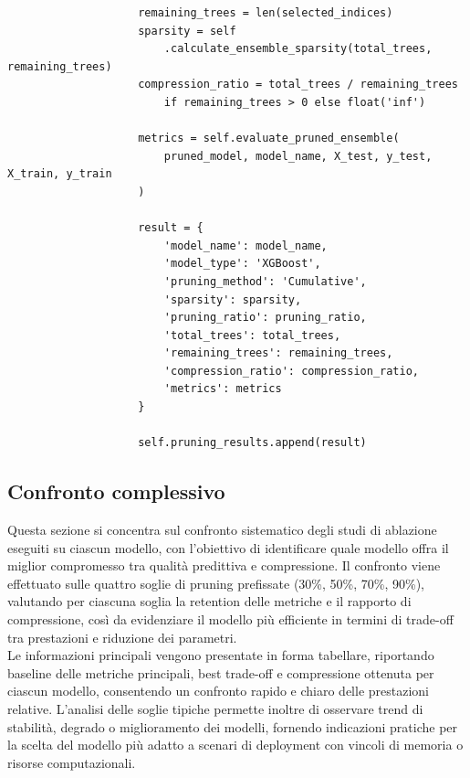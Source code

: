 \documentclass[a4paper,12pt]{report}
\begin{document}
\begin{verbatim}
					remaining_trees = len(selected_indices)
					sparsity = self
						.calculate_ensemble_sparsity(total_trees, remaining_trees)
					compression_ratio = total_trees / remaining_trees 
						if remaining_trees > 0 else float('inf')
					
					metrics = self.evaluate_pruned_ensemble(
						pruned_model, model_name, X_test, y_test, X_train, y_train
					)
					
					result = {
						'model_name': model_name,
						'model_type': 'XGBoost',
						'pruning_method': 'Cumulative',
						'sparsity': sparsity,
						'pruning_ratio': pruning_ratio,
						'total_trees': total_trees,
						'remaining_trees': remaining_trees,
						'compression_ratio': compression_ratio,
						'metrics': metrics
					}
					
					self.pruning_results.append(result)
	\end{verbatim}
	
	\subsection{Confronto complessivo}
	Questa sezione si concentra sul confronto sistematico degli studi di ablazione eseguiti su ciascun modello, con l’obiettivo di identificare quale modello offra il miglior compromesso tra qualità predittiva e compressione. Il confronto viene effettuato sulle quattro soglie di pruning prefissate (30\%, 50\%, 70\%, 90\%), valutando per ciascuna soglia la retention delle metriche e il rapporto di compressione, così da evidenziare il modello più efficiente in termini di trade-off tra prestazioni e riduzione dei parametri. \\
	Le informazioni principali vengono presentate in forma tabellare, riportando baseline delle metriche principali, best trade-off e compressione ottenuta per ciascun modello, consentendo un confronto rapido e chiaro delle prestazioni relative. L’analisi delle soglie tipiche permette inoltre di osservare trend di stabilità, degrado o miglioramento dei modelli, fornendo indicazioni pratiche per la scelta del modello più adatto a scenari di deployment con vincoli di memoria o risorse computazionali. \\
	
\end{document}
